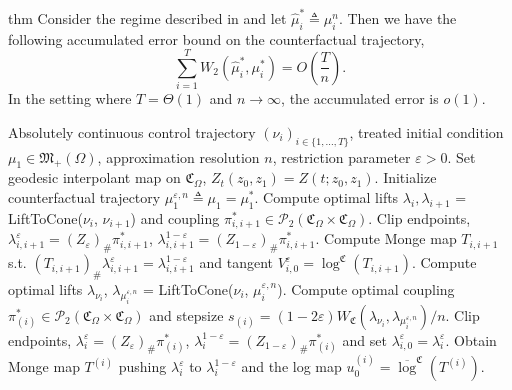 \documentclass[11pt]{article}
\begin{document}
\begin{restatable}{thm}{}
    Consider the regime described in  and let $\hat{\mu}_i^* \triangleq \mu_i^n$. Then we have the following accumulated error bound on the counterfactual trajectory,
    \[\sum_{i = 1}^TW_2(\hat{\mu}_i^*, \mu_i^*) = O\left(\frac{T}{n}\right).\]
    In the setting where $T = \Theta(1)$ and $n \rightarrow \infty$, the accumulated error is $o(1)$. 
\end{restatable}


\begin{algorithm}[H]
    \begin{algorithmic}[1] 
        \caption{Population counterfactual trajectory reconstruction on $(\mathfrak{M}_+(\Omega), \text{HK})$}
        \label{alg: HK trajectory reconstruction}
        \Require Absolutely continuous control trajectory $(\nu_i)_{i \in \{1, \dots, T\}}$, treated initial condition $\mu_1 \in \mathfrak{M}_+(\Omega)$, approximation resolution $n$, restriction parameter $\varepsilon > 0$. 
        \State Set geodesic interpolant map on $\mathfrak{C}_\Omega$, $Z_t(z_0, z_1) = Z(t; z_0, z_1)$.
        \State Initialize counterfactual trajectory $\mu_1^{\varepsilon, n} \triangleq \mu_1 = \mu_1^*$. 
            \State Compute optimal lifts $\lambda_{i}, \lambda_{i+1}$ = LiftToCone($\nu_i$, $\nu_{i+1}$) and coupling $\pi^*_{i, i+1} \in \mathcal{P}_2(\mathfrak{C}_{\Omega} \times \mathfrak{C}_{\Omega})$. 
            \State Clip endpoints, $\lambda^{\varepsilon}_{i, i+1} = (Z_\varepsilon)_\#\pi^*_{i, i+1}$, $\lambda^{1 - \varepsilon}_{i, i+1} = (Z_{1-\varepsilon})_\#\pi^*_{i, i+1}$.
            \State Compute Monge map $T_{i, i+1}$ s.t. $(T_{i, i+1})_\#\lambda^{\varepsilon}_{i, i+1} = \lambda^{1-\varepsilon}_{i, i+1}$ and tangent $V^\varepsilon_{i, 0} = \log ^{\mathfrak{C}}(T_{i, i+1})$. 
            \State Compute optimal lifts $\lambda_{\nu_{i}}$, $\lambda_{\mu^{\varepsilon, n}_{i}}$ = LiftToCone($\nu_i$, $\mu_{i}^{\varepsilon, n}$).
            \State Compute optimal coupling $\pi^*_{(i)} \in \mathcal{P}_2(\mathfrak{C}_{\Omega} \times \mathfrak{C}_{\Omega})$ and stepsize $s_{(i)} = (1-2\varepsilon)W_\mathfrak{C}(\lambda_{\nu_{i}}, \lambda_{\mu_{i}^{\varepsilon, n}})/n$. 
            \State Clip endpoints, $\lambda^{\varepsilon}_i = (Z_\varepsilon)_\#\pi^*_{(i)}$, $\lambda_{i}^{1-\varepsilon} = (Z_{1-\varepsilon})_\#\pi^*_{(i)}$ and set $\lambda_{i, 0}^\varepsilon = \lambda_i^{\varepsilon}$.
            \State Obtain Monge map $T^{(i)}$ pushing $ \lambda^{\varepsilon}_{i}$ to $\lambda^{1-\varepsilon}_{i}$ and the log map $u^{(i)}_0 = \overline{\log}^\mathfrak{C}(T^{(i)})$.

\end{algorithmic}
\end{algorithm}
\end{document}
